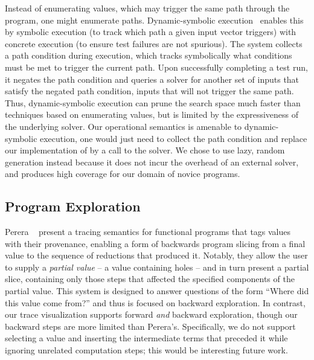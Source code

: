 Instead of enumerating values, which may trigger the same path through
the program, one might enumerate paths. 
%
Dynamic-symbolic execution~\cite{godefroid_dart:_2005,cadar_klee:_2008,tillmann_pex_2008}
%
enables this by symbolic execution (to track which path a given input
vector triggers) with concrete execution (to ensure test failures are
not spurious). The system collects a path condition during execution,
which tracks symbolically what conditions must be met to trigger the
current path. Upon successfully completing a test run, it negates the
path condition and queries a solver for another set of inputs that
satisfy the negated path condition, \ie inputs that will not trigger the
same path. Thus, dynamic-symbolic execution can prune the search space
much faster than techniques based on enumerating values, but is limited
by the expressiveness of the underlying solver. Our operational
semantics is amenable to dynamic-symbolic execution, one would just need
to collect the path condition and replace our implementation of \gensym
by a call to the solver. We chose to use lazy, random generation instead
because it does not incur the overhead of an external solver, and
produces high coverage for our domain of novice programs.


\subsection{Program Exploration}
Perera \etal~\cite{perera_functional_2012} present a tracing semantics
for functional programs that tags values with their provenance, enabling
a form of backwards program slicing from a final value to the sequence
of reductions that produced it. Notably, they allow the user to supply a
\emph{partial value} -- a value containing holes -- and in turn present
a partial slice, containing only those steps that affected the specified
components of the partial value. This system is designed to answer
questions of the form ``Where did this value come from?'' and thus is
focused on backward exploration. In contrast, our trace visualization
supports forward \emph{and} backward exploration, though our backward
steps are more limited than Perera's. Specifically, we do not support
selecting a value and inserting the intermediate terms that preceded it
while ignoring unrelated computation steps; this would be interesting
future work.



